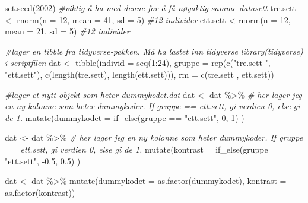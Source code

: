 \documentclass[
]{book}
\newenvironment{Shaded}{\begin{snugshade}}{\end{snugshade}}
\newcommand{\AttributeTok}[1]{\textcolor[rgb]{0.77,0.63,0.00}{#1}}
\newcommand{\CommentTok}[1]{\textcolor[rgb]{0.56,0.35,0.01}{\textit{#1}}}
\newcommand{\DecValTok}[1]{\textcolor[rgb]{0.00,0.00,0.81}{#1}}
\newcommand{\FloatTok}[1]{\textcolor[rgb]{0.00,0.00,0.81}{#1}}
\newcommand{\FunctionTok}[1]{\textcolor[rgb]{0.00,0.00,0.00}{#1}}
\newcommand{\NormalTok}[1]{#1}
\newcommand{\OtherTok}[1]{\textcolor[rgb]{0.56,0.35,0.01}{#1}}
\newcommand{\SpecialCharTok}[1]{\textcolor[rgb]{0.00,0.00,0.00}{#1}}
\newcommand{\StringTok}[1]{\textcolor[rgb]{0.31,0.60,0.02}{#1}}
\begin{document}
\begin{Shaded}
\begin{Highlighting}[]
\FunctionTok{set.seed}\NormalTok{(}\DecValTok{2002}\NormalTok{) }\CommentTok{\#viktig å ha med denne for å få nøyaktig samme datasett}
\NormalTok{tre.sett }\OtherTok{\textless{}{-}} \FunctionTok{rnorm}\NormalTok{(}\AttributeTok{n =} \DecValTok{12}\NormalTok{, }\AttributeTok{mean =} \DecValTok{41}\NormalTok{, }\AttributeTok{sd =} \DecValTok{5}\NormalTok{) }\CommentTok{\#12 individer}
\NormalTok{ett.sett }\OtherTok{\textless{}{-}}\FunctionTok{rnorm}\NormalTok{(}\AttributeTok{n =} \DecValTok{12}\NormalTok{, }\AttributeTok{mean =} \DecValTok{21}\NormalTok{, }\AttributeTok{sd =} \DecValTok{5}\NormalTok{) }\CommentTok{\#12 individer}

\CommentTok{\#lager en tibble fra tidyverse{-}pakken. Må ha lastet inn tidyverse library(tidyverse) i scriptfilen}
\NormalTok{dat }\OtherTok{\textless{}{-}} \FunctionTok{tibble}\NormalTok{(}\AttributeTok{individ =} \FunctionTok{seq}\NormalTok{(}\DecValTok{1}\SpecialCharTok{:}\DecValTok{24}\NormalTok{),}
              \AttributeTok{gruppe =} \FunctionTok{rep}\NormalTok{(}\FunctionTok{c}\NormalTok{(}\StringTok{"tre.sett "}\NormalTok{, }\StringTok{"ett.sett"}\NormalTok{), }\FunctionTok{c}\NormalTok{(}\FunctionTok{length}\NormalTok{(tre.sett), }\FunctionTok{length}\NormalTok{(ett.sett))),}
              \AttributeTok{rm =} \FunctionTok{c}\NormalTok{(tre.sett , ett.sett))}


\CommentTok{\#lager et nytt objekt som heter dummykodet.dat}
\NormalTok{dat }\OtherTok{\textless{}{-}}\NormalTok{ dat }\SpecialCharTok{\%\textgreater{}\%}
  \CommentTok{\# her lager jeg en ny kolonne som heter dummykoder. If gruppe == \textquotesingle{}ett.sett\textquotesingle{}, gi verdien 0, else gi de 1.}
  \FunctionTok{mutate}\NormalTok{(}\AttributeTok{dummykodet =} \FunctionTok{if\_else}\NormalTok{(gruppe }\SpecialCharTok{==} \StringTok{"ett.sett"}\NormalTok{, }\DecValTok{0}\NormalTok{, }\DecValTok{1}\NormalTok{)}
\NormalTok{  )}


\NormalTok{dat }\OtherTok{\textless{}{-}}\NormalTok{ dat }\SpecialCharTok{\%\textgreater{}\%}
  \CommentTok{\# her lager jeg en ny kolonne som heter dummykoder. If gruppe == \textquotesingle{}ett.sett\textquotesingle{}, gi verdien 0, else gi de 1.}
  \FunctionTok{mutate}\NormalTok{(}\AttributeTok{kontrast =} \FunctionTok{if\_else}\NormalTok{(gruppe }\SpecialCharTok{==} \StringTok{"ett.sett"}\NormalTok{, }\SpecialCharTok{{-}}\FloatTok{0.5}\NormalTok{, }\FloatTok{0.5}\NormalTok{)}
\NormalTok{  )}

\NormalTok{dat }\OtherTok{\textless{}{-}}\NormalTok{ dat }\SpecialCharTok{\%\textgreater{}\%}
  \FunctionTok{mutate}\NormalTok{(}\AttributeTok{dummykodet =} \FunctionTok{as.factor}\NormalTok{(dummykodet),}
         \AttributeTok{kontrast =} \FunctionTok{as.factor}\NormalTok{(kontrast))}
\end{Highlighting}
\end{Shaded}
\end{document}
